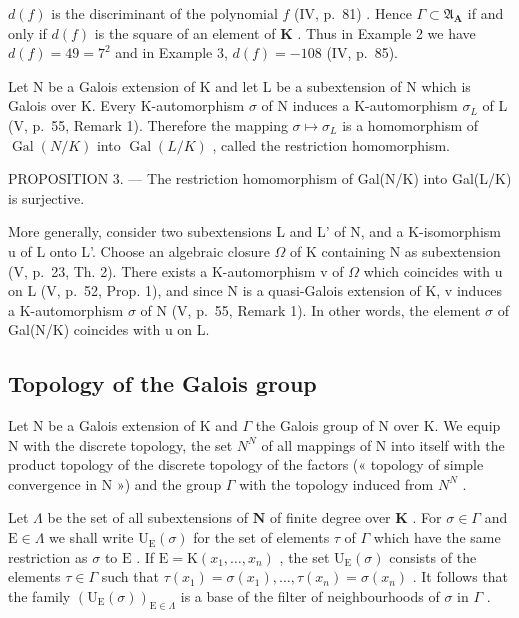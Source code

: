 \(d(f)\) is the discriminant of the polynomial \(f\) (IV, p.~81) . Hence \(\Gamma \subset \mathfrak{A}_{\mathbf{A}}\) if and only if \(d(f)\) is the square of an element of \(\mathbf{K}\) . Thus in Example 2 we have \(d(f) = 49 = 7^2\) and in Example 3, \(d(f) = -108\) (IV, p.~85).

Let N be a Galois extension of K and let L be a subextension of N which is Galois over K. Every K-automorphism \(\sigma\) of N induces a K-automorphism \(\sigma_{L}\) of L (V, p.~55, Remark 1). Therefore the mapping \(\sigma \mapsto \sigma_{L}\) is a homomorphism of \(\operatorname{Gal}(N/K)\) into \(\operatorname{Gal}(L/K)\) , called the restriction homomorphism.

PROPOSITION 3. --- The restriction homomorphism of Gal(N/K) into Gal(L/K) is surjective.

More generally, consider two subextensions L and L' of N, and a K-isomorphism u of L onto L'. Choose an algebraic closure \(\Omega\) of K containing N as subextension (V, p.~23, Th. 2). There exists a K-automorphism v of \(\Omega\) which coincides with u on L (V, p.~52, Prop. 1), and since N is a quasi-Galois extension of K, v induces a K-automorphism \(\sigma\) of N (V, p.~55, Remark 1). In other words, the element \(\sigma\) of Gal(N/K) coincides with u on L.

\subsection{Topology of the Galois group}

Let N be a Galois extension of K and \(\Gamma\) the Galois group of N over K. We equip N with the discrete topology, the set \(N^{N}\) of all mappings of N into itself with the product topology of the discrete topology of the factors (« topology of simple convergence in N ») and the group \(\Gamma\) with the topology induced from \(N^{N}\) .

Let \(\Lambda\) be the set of all subextensions of \(\mathbf{N}\) of finite degree over \(\mathbf{K}\) . For \(\sigma \in \Gamma\) and \(\mathrm{E} \in \Lambda\) we shall write \(\mathrm{U}_{\mathrm{E}}(\sigma)\) for the set of elements \(\tau\) of \(\Gamma\) which have the same restriction as \(\sigma\) to \(\mathrm{E}\) . If \(\mathrm{E} = \mathrm{K}(x_1, \ldots, x_n)\) , the set \(\mathrm{U}_{\mathrm{E}}(\sigma)\) consists of the elements \(\tau \in \Gamma\) such that \(\tau(x_1) = \sigma(x_1), \ldots, \tau(x_n) = \sigma(x_n)\) . It follows that the family \((\mathrm{U}_{\mathrm{E}}(\sigma))_{\mathrm{E} \in \Lambda}\) is a base of the filter of neighbourhoods of \(\sigma\) in \(\Gamma\) .

